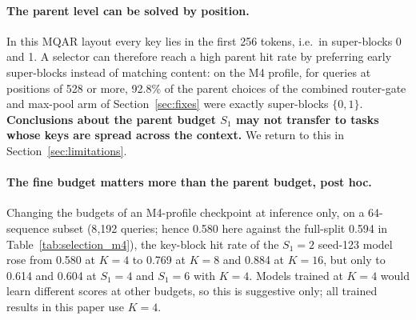 \paragraph{The parent level can be solved by position.} In this MQAR layout every key lies in the first 256 tokens,
i.e.\ in super-blocks 0 and 1. A selector can therefore reach a high parent hit rate by preferring early
super-blocks instead of matching content: on the M4 profile, for queries at positions of 528 or more, 92.8\% of the
parent choices of the combined router-gate and max-pool arm of Section~\ref{sec:fixes} were exactly super-blocks
$\{0, 1\}$. \textbf{Conclusions about the parent budget $S_1$ may not transfer to tasks whose keys are spread across
the context.} We return to this in Section~\ref{sec:limitations}.

\paragraph{The fine budget matters more than the parent budget, post hoc.} Changing the budgets of an M4-profile
checkpoint at inference only, on a 64-sequence subset (8{,}192 queries; hence 0.580 here against the full-split 0.594 in
Table~\ref{tab:selection_m4}), the key-block hit rate of the $S_1{=}2$ seed-123 model rose from 0.580 at $K{=}4$ to 0.769 at
$K{=}8$ and 0.884 at $K{=}16$, but only to 0.614 and 0.604 at $S_1{=}4$ and $S_1{=}6$ with $K{=}4$. Models trained at
$K{=}4$ would learn different scores at other budgets, so this is suggestive only; all trained results in this paper use
$K{=}4$.
